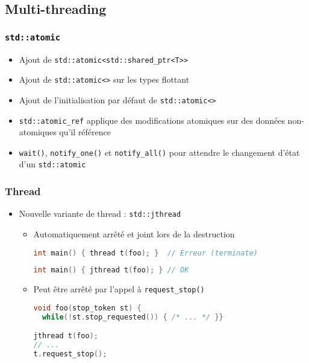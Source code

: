 \documentclass[C++.tex]{subfiles}
\begin{document}
\subsection*{Multi-threading}
\begin{frame}[fragile]
	\frametitle{\lstinline|std::atomic|}
	\begin{itemize}
		\item Ajout de \lstinline|std::atomic<std::shared_ptr<T>>|
		\item Ajout de \lstinline|std::atomic<>| sur les types flottant
		\item Ajout de l'initialisation par défaut de \lstinline|std::atomic<>|
		\item \lstinline|std::atomic_ref| applique des modifications atomiques sur des données non-atomiques qu'il référence
		\item \lstinline|wait()|, \lstinline|notify_one()| et \lstinline|notify_all()| pour attendre le changement d'état d'un \lstinline|std::atomic|
	\end{itemize}
\end{frame}

\begin{frame}[fragile]
	\frametitle{Thread}
	\begin{itemize}
		\item Nouvelle variante de thread : \lstinline|std::jthread|
		\begin{itemize}
			\item Automatiquement arrêté et joint lors de la destruction


\begin{lstlisting}[language=C++]
int main() { thread t(foo); }  // Erreur (terminate)\end{lstlisting}


\begin{lstlisting}[language=C++]
int main() { jthread t(foo); } // OK\end{lstlisting}

			\item Peut être arrêté par l'appel à \lstinline|request_stop()|

\begin{lstlisting}[language=C++]
void foo(stop_token st) {
  while(!st.stop_requested()) { /* ... */ }}

jthread t(foo);
// ...
t.request_stop();\end{lstlisting}
		\end{itemize}
	\end{itemize}
\end{frame}
\end{document}

